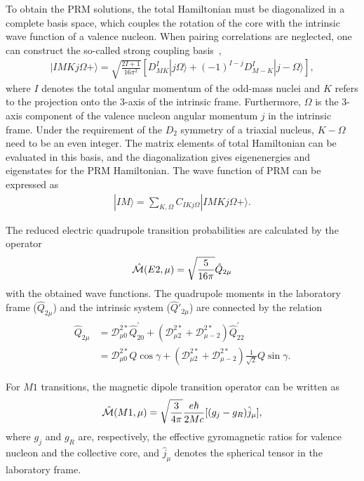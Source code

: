 \documentclass[aps,prc,preprint,showpacs,groupedaddress,floatfix,amsmath,amssymb]{revtex4-1}
\begin{document}
To obtain the PRM solutions, the total Hamiltonian must be diagonalized in a complete basis space, which couples the rotation of the core with the intrinsic wave function of a valence nucleon. When pairing correlations are neglected, one can construct the so-called strong coupling basis~\cite{Ring,Qi09},
\begin{eqnarray}
|I M K j \Omega +\rangle= \sqrt{\frac{2 I+1}{16 \pi^{2}}}\left[D_{M K}^{I}|j \Omega\rangle +(-1)^{I-j} D^{I}_{M-K}|j-\Omega\rangle\right],
\end{eqnarray}
where $I$ denotes the total angular momentum of the odd-mass nuclei and $K$ refers to the projection onto the 3-axis of the intrinsic frame. Furthermore, $\Omega$ is the 3-axis component of the valence nucleon angular momentum $j$ in the intrinsic frame. Under the requirement of the $D_{2}$
symmetry of a triaxial nucleus,
$K-\Omega$ need to be an even integer. The matrix elements of total Hamiltonian can be evaluated in this basis, and the diagonalization gives eigenenergies and eigenstates for the PRM Hamiltonian. The wave function of PRM can be expressed as
\begin{eqnarray}\label{PRMfun}
|I M \rangle = \sum\limits_{K,\Omega} C_{IK j\Omega} |I M K j \Omega +\rangle.
\end{eqnarray}

The reduced  electric quadrupole transition probabilities are calculated by the operator
\begin{eqnarray}
{\hat{\cal{M}}}(E2, \mu) =\sqrt{\frac{5}{16\pi}}\hat{Q}_{2\mu}
\end{eqnarray}
with the obtained wave functions. The quadrupole moments
in the laboratory frame ($\hat{Q}_{2\mu}$) and the intrinsic
system ($\hat{Q}'_{2\mu}$) are connected by the relation
\begin{eqnarray}\label{Q0}
\begin{aligned}
\hat{Q}_{2\mu}&=\mathcal{D}_{\mu 0}^{2 *} \hat{Q}_{20}^{\prime}
+\left(\mathcal{D}_{\mu 2}^{2 *}+\mathcal{D}_{\mu -2}^{2 *}\right) \hat{Q}_{22}^{\prime}\\
&=\mathcal{D}_{\mu 0}^{2 *} Q\cos \gamma
+\left(\mathcal{D}_{\mu 2}^{2 *}+\mathcal{D}_{\mu -2}^{2 *}\right) \frac{1}{\sqrt{2}}Q\sin \gamma.
\end{aligned}
\end{eqnarray}

For $M1$ transitions, the magnetic dipole transition operator can be written as
\begin{eqnarray}
 \hat{\cal{M}} (M1,\mu) = \sqrt{\frac{3}{4\pi}} \frac{e\hbar}{2Mc}
 [(g_j-g_R)\hat{j}_{\mu}],
\end{eqnarray}
where $g_j$ and $g_{R}$ are, respectively, the effective gyromagnetic ratios for valence nucleon and the collective core, and $\hat{j}_{\mu}$ denotes the spherical tensor in the laboratory frame.
\end{document}
